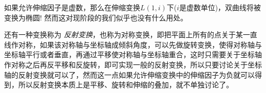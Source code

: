 \begin{example}
  如果允许伸缩因子是虚数，那么在伸缩变换$L(1,i)$下($i$是虚数单位)，双曲线将被变换为椭圆! 然而这对现阶段的我们似乎也没有什么用处。
\end{example}

还有一种变换称为 \emph{反射变换}，也称为对称变换，即把平面上所有的点关于某一直线作对称，如果该对称轴与坐标轴成倾斜角度，可以先做旋转变换，使得对称轴与坐标轴平行或者垂直，再通过平移使对称轴与坐标轴重合，这时只需要关于坐标轴作对称之后再反平移和反旋转，即可实现一般的反射变换，所以只要讨论关于坐标轴的反射变换就可以了，然而这一点如果允许伸缩变换中的伸缩因子为负就可以得到，所以反射变换本质上是平移、旋转和伸缩的叠加，就不单独讨论了。




